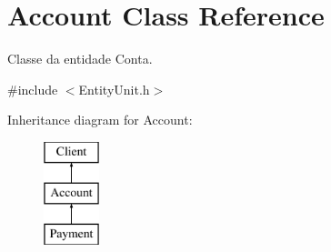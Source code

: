\hypertarget{classAccount}{\section{Account Class Reference}
\label{classAccount}
}


Classe da entidade Conta.  




{\ttfamily \#include $<$Entity\-Unit.\-h$>$}

Inheritance diagram for Account\-:\begin{figure}[H]
\begin{center}
\leavevmode
\includegraphics[height=3.000000cm]{classAccount}
\end{center}
\end{figure}
